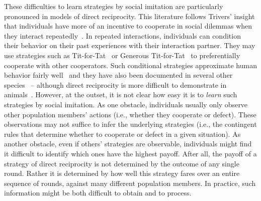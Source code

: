 \documentclass[11pt]{article}
\theoremstyle{plainCl1}
\theoremstyle{plainCl2}
\begin{document}
These difficulties to learn strategies by social imitation are particularly pronounced in models of direct reciprocity. 
This literature follows Trivers' insight that individuals have more of an incentive to cooperate in social dilemmas when they interact repeatedly~\citep{trivers1971evolution}. 
In repeated interactions, individuals can condition their behavior on their past experiences with their interaction partner. 
They may use strategies such as Tit-for-Tat~\citep{rapoport:book:1965,axelrod1981evolution} or Generous Tit-for-Tat~\citep{molander:jcr:1985,Nowak1992tit} to preferentially cooperate with other cooperators. 
Such conditional strategies approximate human behavior fairly well~\citep{fischbacher:EconL:2001,Rand:TCS:2013,DalBo:AER:2019,Rossetti:ETH:2023} and they have also been documented in several other species~\citep{Carter:PRSB:2013,Schweinfurth:AnBehav:2019,Voelkl:PNAS:2015} -- although direct reciprocity is more difficult to demonstrate in animals~\citep{CluttonBrock:Nature:2009,Silk:CurrentBiology:2013,taborsky:CurrentBiology:2013}.
However, at the outset, it is not clear how easy it is to {\it learn} such strategies by social imitation. 
As one obstacle, individuals usually only observe other population members' actions (i.e., whether they cooperate or defect). 
These observations may not suffice to infer the underlying strategies (i.e., the contingent rules that determine whether to cooperate or defect in a given situation). 
As another obstacle, even if others' strategies are observable, individuals might find it difficult to identify which ones have the highest payoff. 
After all, the payoff of a strategy of direct reciprocity is not determined by the outcome of any single round.
Rather it is determined by how well this strategy fares over an entire sequence of rounds, against many different population members. 
In practice, such information might be both difficult to obtain and to process. 

\end{document}
